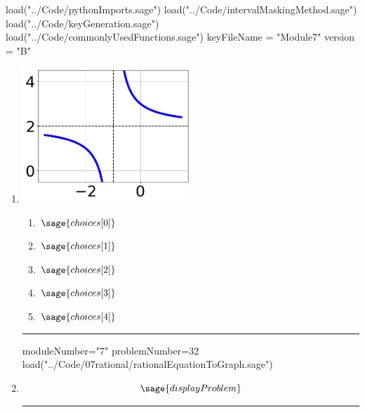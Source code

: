 \documentclass[14pt]{extbook}
\newcommand{\litem}[1]{\item#1\hspace*{-1cm}\rule{\textwidth}{0.4pt}}
\begin{document}
\pagestyle{fancy}

\begin{sagesilent}
load("../Code/pythonImports.sage")
load("../Code/intervalMaskingMethod.sage")
load("../Code/keyGeneration.sage")
load("../Code/commonlyUsedFunctions.sage")
keyFileName = "Module7"
version = "B"
\end{sagesilent}

\begin{enumerate}


  \begin{sagesilent}
  moduleNumber="7"
  problemNumber=31
  load("../Code/07rational/rationalGraphToEquation.sage")
  \end{sagesilent}

  \litem{ 

   \begin{center}
       \includegraphics[width=0.5\textwidth]{../Figures/rationalGraphToEquationB.png}
   \end{center}

  	\begin{enumerate}[label=\Alph*.]
    \item \( \sage{choices[0]} \)
    \item \( \sage{choices[1]} \)
    \item \( \sage{choices[2]} \)
    \item \( \sage{choices[3]} \)
    \item \( \sage{choices[4]} \)
  	\end{enumerate}
  }

\begin{sagesilent}
moduleNumber="7"
problemNumber=32
load("../Code/07rational/rationalEquationToGraph.sage")
\end{sagesilent}

\litem{ 

\[ \sage{displayProblem} \]

}
\end{enumerate}
\end{document}
